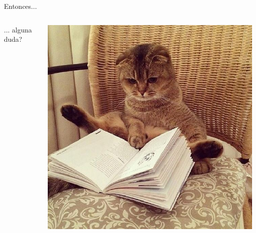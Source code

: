 \begin{frame}{Entonces...}

    \begin{columns}[T]
        \begin{column}{0.4\linewidth}
            \vspace{3.3cm}

            \Huge ... alguna duda?
        \end{column}
        \begin{column}{0.58\linewidth}
            
            \includegraphics[height=0.8\textheight, width=\linewidth]{img/doubts.jpg}
        \end{column}
        
    \end{columns}
    
\end{frame}



